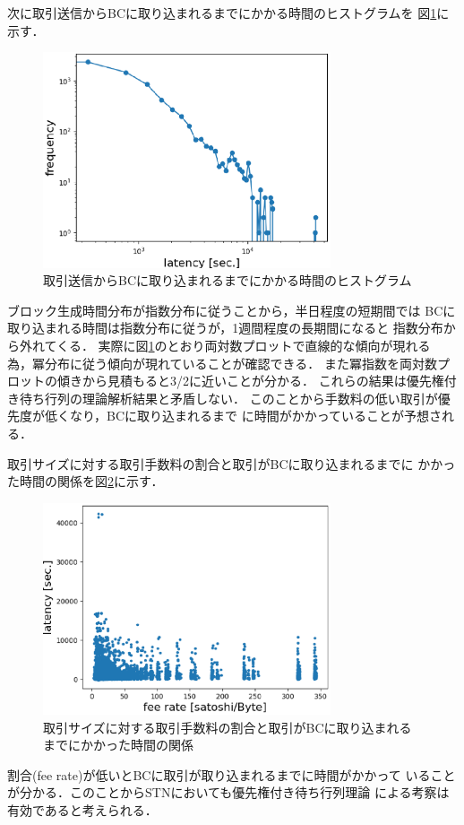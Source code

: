 \documentclass[graybox]{svmult}
\begin{document}
次に取引送信からBCに取り込まれるまでにかかる時間のヒストグラムを
図\ref{fig:exp3-2}に示す．
%
\begin{figure}[t]
  \begin{center}
    \includegraphics[width=85mm]{exp3-2.eps}
  \end{center}
  \caption{取引送信からBCに取り込まれるまでにかかる時間のヒストグラム}
  \label{fig:exp3-2}
\end{figure}
%
ブロック生成時間分布が指数分布に従うことから，半日程度の短期間では
BCに取り込まれる時間は指数分布に従うが，1週間程度の長期間になると
指数分布から外れてくる．
実際に図\ref{fig:exp3-2}のとおり両対数プロットで直線的な傾向が現れる
為，冪分布に従う傾向が現れていることが確認できる．
また冪指数を両対数プロットの傾きから見積もると3/2に近いことが分かる．
これらの結果は優先権付き待ち行列の理論解析結果と矛盾しない．
このことから手数料の低い取引が優先度が低くなり，BCに取り込まれるまで
に時間がかかっていることが予想される．

取引サイズに対する取引手数料の割合と取引がBCに取り込まれるまでに
かかった時間の関係を図\ref{fig:exp3-3}に示す．
%
\begin{figure}[t]
  \begin{center}
    \includegraphics[width=85mm]{exp3-3.eps}
  \end{center}
  \caption{取引サイズに対する取引手数料の割合と取引がBCに取り込まれるまでにかかった時間の関係}
  \label{fig:exp3-3}
\end{figure}
%
割合(fee rate)が低いとBCに取引が取り込まれるまでに時間がかかって
いることが分かる．このことからSTNにおいても優先権付き待ち行列理論
による考察は有効であると考えられる．
\end{document}
